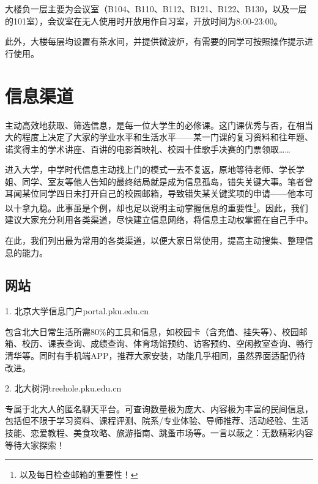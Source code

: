 \vspace{10pt}

大楼负一层主要为会议室（B104、B110、B112、B121、B122、B130，以及一层的101室），会议室在无人使用时开放用作自习室，开放时间为8:00-23:00。

\vspace{10pt}

此外，大楼每层均设置有茶水间，并提供微波炉，有需要的同学可按照操作提示进行使用。

\section{信息渠道}
主动高效地获取、筛选信息，是每一位大学生的必修课。这门课优秀与否，在相当大的程度上决定了大家的学业水平和生活水平——某一门课的复习资料和往年题、诺奖得主的学术讲座、百讲的电影首映礼、校园十佳歌手决赛的门票领取……

\vspace{10pt}

进入大学，中学时代信息主动找上门的模式一去不复返，原地等待老师、学长学姐、同学、室友等他人告知的最终结局就是成为信息孤岛，错失关键大事。笔者曾耳闻某位同学四日未打开自己的校园邮箱，导致错失某关键奖项的申请——他本可以十拿九稳。此事虽是个例，却也足以说明主动掌握信息的重要性\footnote{以及每日检查邮箱的重要性！}。因此，我们建议大家充分利用各类渠道，尽快建立信息网络，将信息主动权掌握在自己手中。

\vspace{10pt}

在此，我们列出最为常用的各类渠道，以便大家日常使用，提高主动搜集、整理信息的能力。

\subsection{网站}

1. 北京大学信息门户\quad portal.pku.edu.cn

包含北大日常生活所需80\%的工具和信息，如校园卡（含充值、挂失等）、校园邮箱、校历、课表查询、成绩查询、体育场馆预约、访客预约、空闲教室查询、畅行清华等。同时有手机端APP，推荐大家安装，功能几乎相同，虽然界面适配仍待改进。

\vspace{10pt}

2. 北大树洞\quad treehole.pku.edu.cn

专属于北大人的匿名聊天平台。可查询数量极为庞大、内容极为丰富的民间信息，包括但不限于学习资料、课程评测、院系/专业体验、导师推荐、活动经验、生活技能、恋爱教程、美食攻略、旅游指南、跳蚤市场等。一言以蔽之：无数精彩内容等待大家探索！

